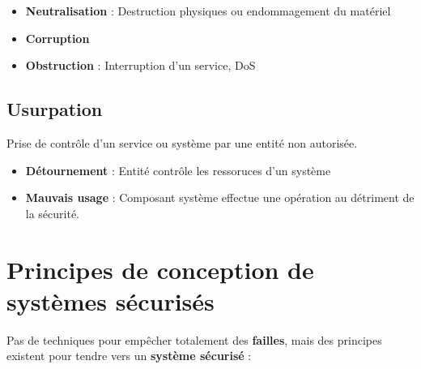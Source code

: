 \documentclass{report}
\begin{document}
			\begin{itemize}
				\item \textbf{Neutralisation} : Destruction physiques ou endommagement du matériel
				\item \textbf{Corruption}
				\item \textbf{Obstruction} : Interruption d'un service, DoS\\
			\end{itemize}

		\subsection{Usurpation}

			Prise de contrôle d'un service ou système par une entité non autorisée.\\

			\begin{itemize}
				\item \textbf{Détournement} : Entité contrôle les ressoruces d'un système
				\item \textbf{Mauvais usage} : Composant système effectue une opération au détriment de la sécurité.\\
			\end{itemize}

	\section{Principes de conception de systèmes sécurisés}

		Pas de techniques pour empêcher totalement des \textbf{failles}, mais des principes existent pour tendre vers un \textbf{système sécurisé} : \\
\end{document}

